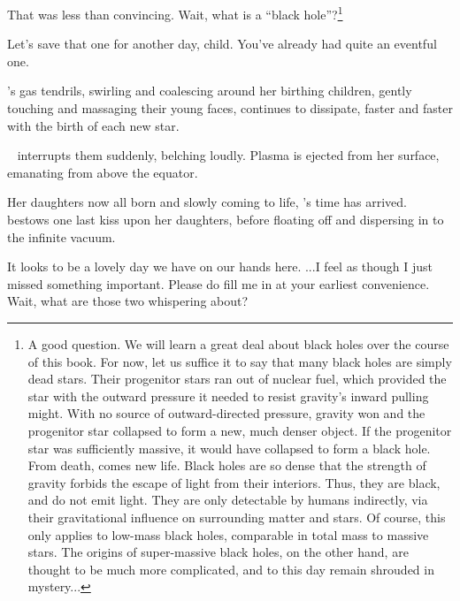 \documentclass[main.tex]{subfiles}
\begin{document}
\par \Maia That was less than convincing.  Wait, what is a ``black hole''?\footnote{A good question.  We will learn a great deal about black holes over the course of this book.  For now, let us suffice it to say that many black holes are simply dead stars. Their progenitor stars ran out of nuclear fuel, which provided the star with the outward pressure it needed to resist gravity's inward pulling might.  With no source of outward-directed pressure, gravity won and the progenitor star collapsed to form a new, much denser object.  If the progenitor star was sufficiently massive, it would have collapsed to form a black hole.  From death, comes new life.  Black holes are so dense that the strength of gravity forbids the escape of light from their interiors.  Thus, they are black, and do not emit light.  They are only detectable by humans indirectly, via their gravitational influence on surrounding matter and stars.  Of course, this only applies to low-mass black holes, comparable in total mass to massive stars.  The origins of super-massive black holes, on the other hand, are thought to be much more complicated, and to this day remain shrouded in mystery...}

\par \Pleione Let's save that one for another day, child.  You've already had quite an eventful one.

\par \nar \rmpleione's gas tendrils, swirling and coalescing around her birthing children, gently touching and massaging their young faces, continues to dissipate, faster and faster with the birth of each new star.

\par \nar \rmelectra~ interrupts them suddenly, belching loudly.  Plasma is ejected from her surface, emanating from above the equator.  

\par \nar Her daughters now all born and slowly coming to life, \rmpleione's time has arrived. \rmpleione~ bestows one last kiss upon her daughters, before floating off and dispersing in to the infinite vacuum.

\par \Electra It looks to be a lovely day we have on our hands here. ...I feel as though I just missed something important.  Please do fill me in at your earliest convenience.  Wait, what are those two whispering about?
\end{document}

